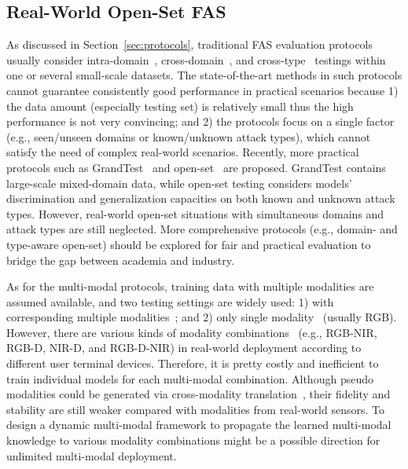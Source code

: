 \documentclass[10pt,journal,compsoc]{IEEEtran}
\begin{document}
\vspace{-0.5em}
\subsection{Real-World Open-Set FAS}
As discussed in Section~\ref{sec:protocols}, traditional FAS evaluation protocols usually consider intra-domain~\cite{Boulkenafet2017OULU}, cross-domain~\cite{shao2019multi}, and cross-type~\cite{liu2019deep} testings within one or several small-scale datasets. The state-of-the-art methods in such protocols cannot guarantee consistently good performance in practical scenarios because 1) the data amount (especially testing set) is relatively small thus the high performance is not very convincing; and 2) the protocols focus on a single factor (e.g., seen/unseen domains or known/unknown attack types), which cannot satisfy the need of complex real-world scenarios. Recently, more practical protocols such as GrandTest~\cite{perez2020learning} and open-set~\cite{liu2021contrastive,liu2020physics} are proposed. GrandTest contains large-scale mixed-domain data, while open-set testing considers models' discrimination and generalization capacities on both known and unknown attack types. However, real-world open-set situations with simultaneous domains and attack types are still neglected. More comprehensive protocols (e.g., domain- and type-aware open-set) should be explored for fair and practical evaluation to bridge the gap between academia and industry.  


As for the multi-modal protocols, training data with multiple modalities are assumed available, and two testing settings are widely used: 1) with corresponding multiple modalities~\cite{liu2020cross}; and 2) only single modality~\cite{george2021cross,liu2021face} (usually RGB). However, there are various kinds of modality combinations~\cite{yu2022flexible} (e.g., RGB-NIR, RGB-D, NIR-D, and RGB-D-NIR) in real-world deployment according to different user terminal devices. Therefore, it is pretty costly and inefficient to train individual models for each multi-modal combination. Although pseudo modalities could be generated via cross-modality translation~\cite{jiang2020face,liu2021face}, their fidelity and stability are still weaker compared with modalities from real-world sensors. To design a dynamic multi-modal framework to propagate the learned multi-modal knowledge to various modality combinations might be a possible direction for unlimited multi-modal deployment. 
\end{document}
